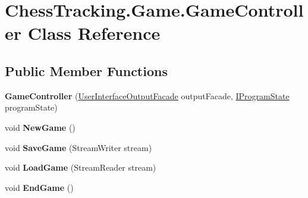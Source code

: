 \hypertarget{class_chess_tracking_1_1_game_1_1_game_controller}{}\section{Chess\+Tracking.\+Game.\+Game\+Controller Class Reference}
\label{class_chess_tracking_1_1_game_1_1_game_controller}
\subsection*{Public Member Functions}
\begin{DoxyCompactItemize}
\item 
\mbox{\label{class_chess_tracking_1_1_game_1_1_game_controller_a3130429ed01f57cd8415189785d4871f}} 
{\bfseries Game\+Controller} (\mbox{\hyperlink{class_chess_tracking_1_1_user_interface_1_1_user_interface_output_facade}{User\+Interface\+Output\+Facade}} output\+Facade, \mbox{\hyperlink{interface_chess_tracking_1_1_controlling_elements_1_1_program_state_1_1_i_program_state}{I\+Program\+State}} program\+State)
\item 
\mbox{\label{class_chess_tracking_1_1_game_1_1_game_controller_afbff67125433463c28e0195ed4a39abd}} 
void {\bfseries New\+Game} ()
\item 
\mbox{\label{class_chess_tracking_1_1_game_1_1_game_controller_a3c3415cdf46da70b1a08b19150b18801}} 
void {\bfseries Save\+Game} (Stream\+Writer stream)
\item 
\mbox{\label{class_chess_tracking_1_1_game_1_1_game_controller_a7270a826f8abd09bdfd4335c0ff4531f}} 
void {\bfseries Load\+Game} (Stream\+Reader stream)
\item 
\mbox{\label{class_chess_tracking_1_1_game_1_1_game_controller_afc8c33f18ba197d63e71995c67c06a2f}} 
void {\bfseries End\+Game} ()
\item 
\mbox{\label{class_chess_tracking_1_1_game_1_1_game_controller_a7a84e091ad1f8f5d88926b58cadfe9c3}} 

\end{DoxyCompactItemize}
